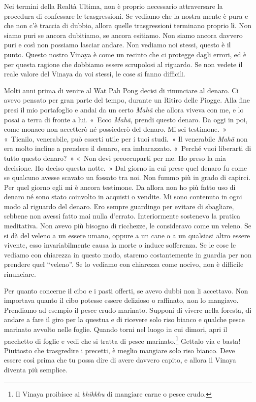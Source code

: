 Nei termini della Realtà Ultima, non è proprio necessario attraversare
la procedura di confessare le trasgressioni. Se vediamo che la nostra
mente è pura e che non c'è traccia di dubbio, allora quelle
trasgressioni terminano proprio lì. Non siamo puri se ancora dubitiamo,
se ancora esitiamo. Non siamo ancora davvero puri e così non possiamo
lasciar andare. Non vediamo noi stessi, questo è il punto. Questo nostro
Vinaya è come un recinto che ci protegge dagli errori, ed è per questa
ragione che dobbiamo essere scrupolosi al riguardo. Se non vedete il
reale valore del Vinaya da voi stessi, le cose si fanno difficili.

Molti anni prima di venire al Wat Pah Pong decisi di rinunciare al
denaro. Ci avevo pensato per gran parte del tempo, durante un Ritiro
delle Piogge. Alla fine presi il mio portafoglio e andai da un certo
\emph{Mahā} che allora viveva con me, e lo posai a terra di fronte a
lui. «~Ecco \emph{Mahā}, prendi questo denaro. Da oggi in poi, come
monaco non accetterò né possiederò del denaro. Mi sei testimone.~»
«~Tienilo, venerabile, può esserti utile per i tuoi studi.~» Il
venerabile \emph{Mahā} non era molto incline a prendere il denaro, era
imbarazzato. «~Perché vuoi liberarti di tutto questo denaro?~» «~Non
devi preoccuparti per me. Ho preso la mia decisione. Ho deciso questa
notte.~» Dal giorno in cui prese quel denaro fu come se qualcuno avesse
scavato un fossato tra noi. Non fummo più in grado di capirci. Per quel
giorno egli mi è ancora testimone. Da allora non ho più fatto uso di
denaro né sono stato coinvolto in acquisti o vendite. Mi sono contenuto
in ogni modo al riguardo del denaro. Ero sempre guardingo per evitare di
sbagliare, sebbene non avessi fatto mai nulla d'errato. Interiormente
sostenevo la pratica meditativa. Non avevo più bisogno di ricchezze, le
consideravo come un veleno. Se si dà del veleno a un essere umano,
oppure a un cane o a un qualsiasi altro essere vivente, esso
invariabilmente causa la morte o induce sofferenza. Se le cose le
vediamo con chiarezza in questo modo, staremo costantemente in guardia
per non prendere quel ``veleno''. Se lo vediamo con chiarezza come
nocivo, non è difficile rinunciare.

Per quanto concerne il cibo e i pasti offerti, se avevo dubbi non li
accettavo. Non importava quanto il cibo potesse essere delizioso o
raffinato, non lo mangiavo. Prendiamo ad esempio il pesce crudo
marinato. Supponi di vivere nella foresta, di andare a fare il giro per
la questua e di ricevere solo riso bianco e qualche pesce marinato
avvolto nelle foglie. Quando torni nel luogo in cui dimori, apri il
pacchetto di foglie e vedi che si tratta di pesce marinato.\footnote{Il
  Vinaya proibisce ai \emph{bhikkhu} di mangiare carne o pesce crudo.}
Gettalo via e basta! Piuttosto che trasgredire i precetti, è meglio
mangiare solo riso bianco. Deve essere così prima che tu possa dire di
avere davvero capito, e allora il Vinaya diventa più semplice.

